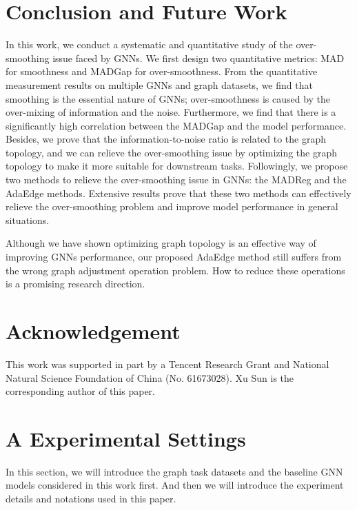 \documentclass[letterpaper]{article} \usepackage{aaai20}  \usepackage{times}  \usepackage{helvet} \usepackage{courier}  \usepackage[hyphens]{url}  \usepackage{graphicx} \urlstyle{rm} \def\UrlFont{\rm}  \frenchspacing  \setlength{\pdfpagewidth}{8.5in}  \setlength{\pdfpageheight}{11in}  \setcounter{secnumdepth}{0}
\begin{document}
\section{Conclusion and Future Work}
In this work, we conduct a systematic and quantitative study of the over-smoothing issue faced by GNNs. We first design two quantitative metrics: MAD for smoothness and MADGap for over-smoothness. 
From the quantitative measurement results on multiple GNNs and graph datasets, we find that smoothing is the essential nature of GNNs; over-smoothness is caused by the over-mixing of information and the noise.
Furthermore, we find that there is a significantly high correlation between the MADGap and the model performance. Besides, we prove that the information-to-noise ratio is related to the graph topology, and we can relieve the over-smoothing issue by optimizing the graph topology to make it more suitable for downstream tasks. 
Followingly, we propose two methods to relieve the over-smoothing issue in GNNs: the MADReg and the AdaEdge methods. Extensive results prove that these two methods can effectively relieve the over-smoothing problem and improve model performance in general situations.

Although we have shown optimizing graph topology is an effective way of improving GNNs performance, our proposed AdaEdge method still suffers from the wrong graph adjustment operation problem. How to reduce these operations is a promising research direction. 

\section{Acknowledgement}
This work was supported in part by a Tencent Research Grant and National Natural Science Foundation of China (No. 61673028). Xu Sun is the corresponding author of this paper.




\appendix
\section{A Experimental Settings}
In this section, we will introduce the graph task datasets and the baseline GNN models considered in this work first. And then we will introduce the experiment details and notations used in this paper.
\end{document}
